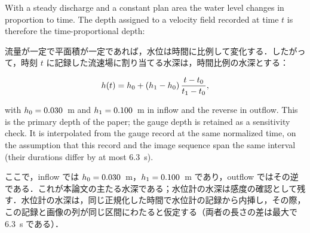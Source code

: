 
\begin{en}[M3-4]
With a steady discharge and a constant plan area the water level changes in proportion to time. The depth assigned to a velocity field recorded at time $t$ is therefore the time-proportional depth:
\end{en}
\begin{ja}
流量が一定で平面積が一定であれば，水位は時間に比例して変化する．したがって，時刻 $t$ に記録した流速場に割り当てる水深は，時間比例の水深とする：
\end{ja}
\begin{equation}
h(t) = h_{0} + (h_{1} - h_{0})\,\frac{t - t_{0}}{t_{1} - t_{0}},
\label{eq:htime}
\end{equation}
\begin{en}
with $h_{0} = 0.030$~m and $h_{1} = 0.100$~m in inflow and the reverse in outflow. This is the primary depth of the paper; the gauge depth is retained as a sensitivity check. It is interpolated from the gauge record at the same normalized time, on the assumption that this record and the image sequence span the same interval (their durations differ by at most 6.3~s).
\end{en}
\begin{ja}
ここで，inflow では $h_{0} = 0.030$~m，$h_{1} = 0.100$~m であり，outflow ではその逆である．これが本論文の主たる水深である；水位計の水深は感度の確認として残す．水位計の水深は，同じ正規化した時間で水位計の記録から内挿し，その際，この記録と画像の列が同じ区間にわたると仮定する（両者の長さの差は最大で 6.3~s である）．
\end{ja}

